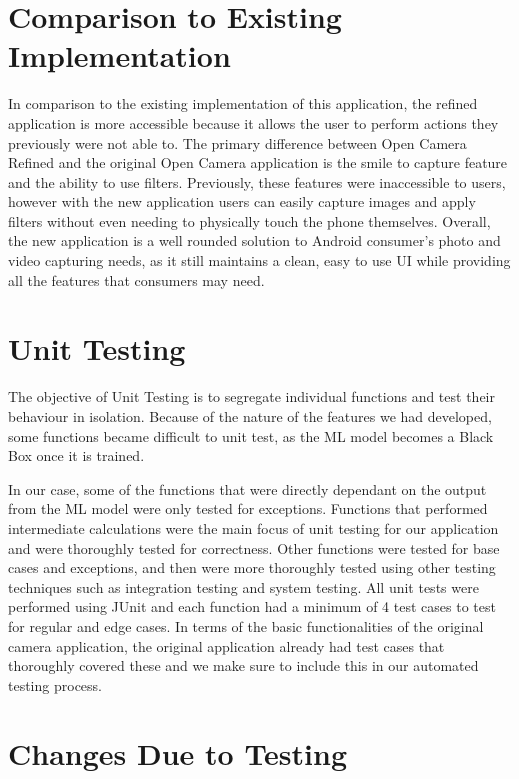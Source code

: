 \documentclass[12pt, titlepage]{article}
\begin{document}
	
\section{Comparison to Existing Implementation}	

In comparison to the existing implementation of this application, the refined application is more accessible because it allows the user to perform actions they previously were not able to. The primary difference between Open Camera Refined and the original Open Camera application is the smile to capture feature and the ability to use filters. Previously, these features were inaccessible to users, however with the new application users can easily capture images and apply filters without even needing to physically touch the phone themselves. Overall, the new application is a well rounded solution to Android consumer's photo and video capturing needs, as it still maintains a clean, easy to use UI while providing all the features that consumers may need.

\section{Unit Testing}

The objective of Unit Testing is to segregate individual functions and test their behaviour in isolation. Because of the nature of the features we had developed, some functions became difficult to unit test, as the ML model becomes a Black Box once it is trained.

In our case, some of the functions that were directly dependant on the output from the ML model were only tested for exceptions. Functions that performed intermediate calculations were the main focus of unit testing for our application and were thoroughly tested for correctness. Other functions were tested for base cases and exceptions, and then were more thoroughly tested using other testing techniques such as integration testing and system testing. All unit tests were performed using JUnit and each function had a minimum of 4 test cases to test for regular and edge cases. In terms of the basic functionalities of the original camera application, the original application already had test cases that thoroughly covered these and we make sure to include this in our automated testing process.

\section{Changes Due to Testing}
\end{document}
